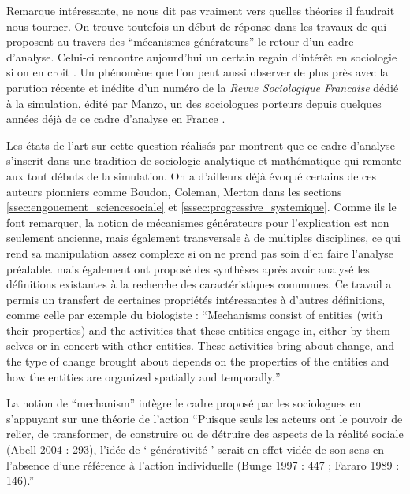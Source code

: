 Remarque intéressante, \textcite{Conte2007} ne nous dit pas vraiment vers quelles théories il faudrait nous tourner. On trouve toutefois un début de réponse dans les travaux de \textcites{Hedstrom2010, Manzo2007, Elsenbroich2012} qui proposent au travers des \enquote{mécanismes générateurs} le retour d'un cadre d'analyse. Celui-ci rencontre aujourd'hui un certain regain d'intérêt en sociologie si on en croit \textcites{Berger2010, Hedstrom2010}. Un phénomène que l'on peut aussi observer de plus près avec la parution récente et inédite  d'un numéro de la \textit{Revue Sociologique Francaise} dédié à la simulation, édité par Manzo, un des sociologues porteurs depuis quelques années déjà de ce cadre d'analyse en France \autocite{Manzo2005, Manzo2007}.

Les états de l'art sur cette question réalisés par \textcites{Manzo2005,Manzo2007, Hedstrom1998, Berger2010} montrent que ce cadre d'analyse s'inscrit dans une tradition de sociologie analytique et mathématique qui remonte aux tout débuts de la simulation. On a d'ailleurs déjà évoqué certains de ces auteurs pionniers comme Boudon, Coleman, Merton dans les sections \ref{ssec:engouement_sciencesociale} et \ref{sssec:progressive_systemique}. Comme ils le font remarquer, la notion de mécanismes générateurs pour l'explication est non seulement ancienne, mais également transversale à de multiples disciplines, ce qui rend sa manipulation assez complexe si on ne prend pas soin d'en faire l'analyse préalable. \textcite{Hedstrom2010} mais également \textcite{Manzo2005} ont proposé des synthèses après avoir analysé les définitions existantes à la recherche des caractéristiques communes. Ce travail a permis un transfert de certaines propriétés intéressantes à d'autres définitions, comme celle par exemple du biologiste \textcite{Machamer2000} : \foreignquote{english}{Mechanisms consist of entities (with their properties) and the activities that these entities engage in, either by themselves or in concert with other entities. These activities bring about change, and the type of change brought about depends on the properties of the entities and how the entities are organized spatially and temporally.}

La notion de \foreignquote{english}{mechanism} intègre le cadre proposé par les sociologues en s'appuyant sur une théorie de l'action \enquote{Puisque seuls les acteurs ont le pouvoir de relier, de transformer, de construire ou de détruire des aspects de la réalité sociale (Abell 2004 : 293), l’idée de  \enquote{ générativité } serait en effet vidée de son sens en l’absence d’une référence à l’action individuelle (Bunge 1997 : 447 ; Fararo 1989 : 146).}


